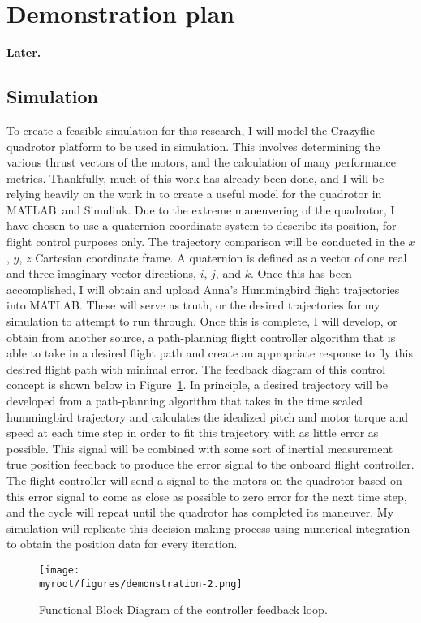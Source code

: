 \documentclass[onecolumn,10pt]{IEEEtran}
\newcommand{\myroot}{../}
\newcommand{\Later}{\textbf{Later.}}
\newcommand{\MATLAB}{MATLAB}
\begin{document}
\section{Demonstration plan}
\Later
\subsection{Simulation}
To create a feasible simulation for this research, I will model the Crazyflie quadrotor platform to be used in simulation. This involves determining the various thrust vectors of the motors, and the calculation of many performance metrics. Thankfully, much of this work has already been done, and I will be relying heavily on the work in \cite{cheng2016flight} to create a useful model for the quadrotor in \MATLAB\ and Simulink. Due to the extreme maneuvering of the quadrotor, I have chosen to use a quaternion coordinate system to describe its position, for flight control purposes only. The trajectory comparison will be conducted in the $x$, $y$, $z$ Cartesian coordinate frame. A quaternion is defined as a vector of one real and three imaginary vector directions, $i$, $j$, and $k$. Once this has been accomplished, I will obtain and upload Anna’s Hummingbird flight trajectories into \MATLAB. These will serve as truth, or the desired trajectories for my simulation to attempt to run through. Once this is complete, I will develop, or obtain from another source, a path-planning flight controller algorithm that is able to take in a desired flight path and create an appropriate response to fly this desired flight path with minimal error. The feedback diagram of this control concept is shown below in Figure~\ref{fig-demonstration-2}. In principle, a desired trajectory will be developed from a path-planning algorithm that takes in the time scaled hummingbird trajectory and calculates the idealized pitch and motor torque and speed at each time step in order to fit this trajectory with as little error as possible. This signal will be combined with some sort of inertial measurement true position feedback to produce the error signal to the onboard flight controller. The flight controller will send a signal to the motors on the quadrotor based on this error signal to come as close as possible to zero error for the next time step, and the cycle will repeat until the quadrotor has completed its maneuver. My simulation will replicate this decision-making process using numerical integration to obtain the position data for every iteration.
\begin{figure}
\begin{center}
\texttt{[image: \\myroot/figures/demonstration-2.png]}
\end{center}
\caption{Functional Block Diagram of the controller feedback loop.}
\label{fig-demonstration-2}
\end{figure}
\end{document}
